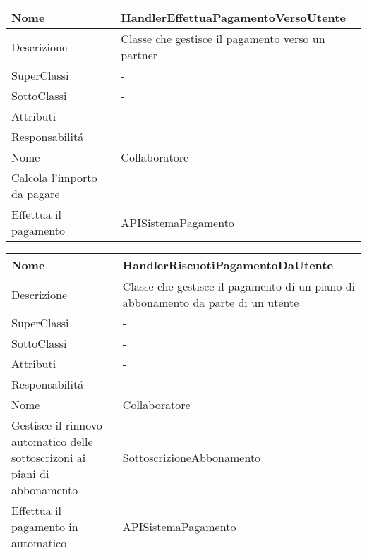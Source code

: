\begin{center}
    \begin{longtable}{ |p{3cm}|p{3cm}|p{3cm}|p{3cm}| }
        \hline
        Nome & \multicolumn{3}{|p{9cm}|}{HandlerEffettuaPagamentoVersoUtente} \\\hline
        Descrizione & \multicolumn{3}{|p{9cm}|}{Classe che gestisce il pagamento verso un partner} \\\hline
        SuperClassi & \multicolumn{3}{|p{9cm}|}{-} \\\hline
        SottoClassi & \multicolumn{3}{|p{9cm}|}{-} \\\hline
        Attributi & \multicolumn{3}{|p{9cm}|}{-} \\\hline
        \multicolumn{4}{|p{12cm}|}{Responsabilit\'a} \\\hline
        \multicolumn{2}{|p{6cm}|}{Nome} & \multicolumn{2}{|p{6cm}|}{Collaboratore} \\\hline
        \multicolumn{2}{|p{6cm}|}{Calcola l'importo da pagare} & \multicolumn{2}{|p{6cm}|}{} \\\hline
        \multicolumn{2}{|p{6cm}|}{Effettua il pagamento} & \multicolumn{2}{|p{6cm}|}{APISistemaPagamento} \\\hline
    \end{longtable}
\end{center}

\begin{center}
    \begin{longtable}{ |p{3cm}|p{3cm}|p{3cm}|p{3cm}| }
        \hline
        Nome & \multicolumn{3}{|p{9cm}|}{HandlerRiscuotiPagamentoDaUtente} \\\hline
        Descrizione & \multicolumn{3}{|p{9cm}|}{Classe che gestisce il pagamento di un piano di abbonamento da parte di un utente} \\\hline
        SuperClassi & \multicolumn{3}{|p{9cm}|}{-} \\\hline
        SottoClassi & \multicolumn{3}{|p{9cm}|}{-} \\\hline
        Attributi & \multicolumn{3}{|p{9cm}|}{-} \\\hline
        \multicolumn{4}{|p{12cm}|}{Responsabilit\'a} \\\hline
        \multicolumn{2}{|p{6cm}|}{Nome} & \multicolumn{2}{|p{6cm}|}{Collaboratore} \\\hline
        \multicolumn{2}{|p{6cm}|}{Gestisce il rinnovo automatico delle sottoscrizoni ai piani di abbonamento} & \multicolumn{2}{|p{6cm}|}{SottoscrizioneAbbonamento} \\\hline
        \multicolumn{2}{|p{6cm}|}{Effettua il pagamento in automatico} & \multicolumn{2}{|p{6cm}|}{APISistemaPagamento} \\\hline
    \end{longtable}
\end{center}

